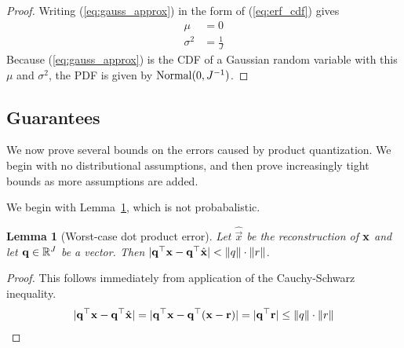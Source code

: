 \documentclass[]{article}
\newtheorem{lemma}{Lemma}[section]
\begin{document}
\begin{proof} Writing (\ref{eq:gauss_approx}) in the form of (\ref{eq:erf_cdf}) gives
\begin{align}
    \mu &= 0 \\
    \sigma^2 &= \frac{1}{J}
\end{align}
Because (\ref{eq:gauss_approx}) is the CDF of a Gaussian random variable with this $\mu$ and $\sigma^2$, the PDF is given by $\operatorname{Normal}(0, J^{-1})$.
\end{proof}


\subsection{Guarantees}%

We now prove several bounds on the errors caused by product quantization. We begin with no distributional assumptions, and then prove increasingly tight bounds as more assumptions are added.

We begin with Lemma~\ref{thm:worst_dotprod}, which is not probabalistic.


\begin{lemma}[Worst-case dot product error] \label{thm:worst_dotprod}
Let $\hat{\vec{x}}$ be the reconstruction of $\mathbf{x}$ and let $\mathbf{q} \in \mathbb{R}^J$ be a vector. Then $\lvert\mathbf{q}^\top \mathbf{x} - \mathbf{q}^\top \hat{\mathbf{x}}\rvert < \lVert q\rVert \cdot \lVert r\rVert$.
\end{lemma}

\begin{proof} \label{thm:dot_unif}
This follows immediately from application of the Cauchy-Schwarz inequality.
\begin{align}
    \lvert\mathbf{q}^\top \mathbf{x} - \mathbf{q}^\top \hat{\mathbf{x}}\rvert = \lvert\mathbf{q}^\top \mathbf{x} - \mathbf{q}^\top (\mathbf{x} - \mathbf{r})\rvert = \lvert\mathbf{q}^\top \mathbf{r}\rvert \le \lVert q\rVert \cdot \lVert r\rVert
\end{align}
\end{proof}
\end{document}
